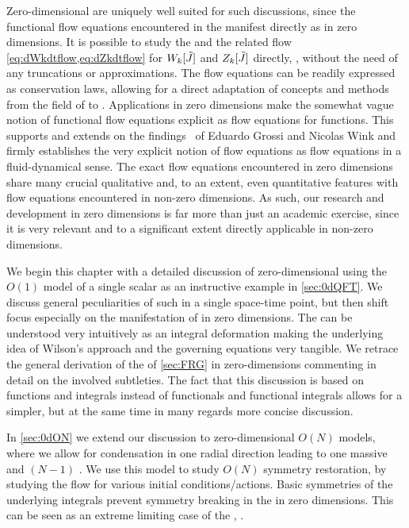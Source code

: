 Zero-dimensional \qfts{} are uniquely well suited for such discussions, since the functional flow equations encountered in the \frg{} manifest directly as \pdes{} in zero dimensions.
It is possible to study the \frgEq{} and the related flow \cref{eq:dWkdtflow,eq:dZkdtflow} for $W_k[\tilde{J}]$ and $Z_k[\tilde{J}]$ directly, \ie{}, without the need of any truncations or approximations.
The flow equations can be readily expressed as conservation laws, allowing for a direct adaptation of concepts and methods from the field of \cfd{} to \frg{}.
Applications in zero dimensions make the somewhat vague notion of functional flow equations explicit as flow equations for functions. 
This supports and extends on the findings~\cite{Grossi:2021ksl} of Eduardo Grossi and Nicolas Wink and firmly establishes the very explicit notion of \frg{} flow equations as flow equations in a fluid-dynamical sense.
The exact flow equations encountered in zero dimensions share many crucial qualitative and, to an extent, even quantitative features with flow equations encountered in non-zero dimensions.
As such, our research and development in zero dimensions is far more than just an academic exercise, since it is very relevant and to a significant extent directly applicable in non-zero dimensions.\bigskip

We begin this chapter with a detailed discussion of zero-dimensional \qft{} using the $O(1)$ model of a single scalar as an instructive example in \cref{sec:0dQFT}.
We discuss general peculiarities of such \qfts{} in a single space-time point, but then shift focus especially on the manifestation of \frg{} in zero dimensions.
The \frg{} can be understood very intuitively  as an integral deformation \dash{} making the underlying idea of Wilson's \rg{} approach and the governing equations very tangible.
We retrace the general derivation of the \frgEq{} of \cref{sec:FRG} in zero-dimensions commenting in detail on the involved subtleties.
The fact that this discussion is based on functions and integrals instead of functionals and functional integrals allows for a simpler, but at the same time in many regards more concise discussion.\bigskip

In \cref{sec:0dON} we extend our discussion to zero-dimensional $O(N)$ models, where we allow for condensation in one radial direction leading to one massive \sigmaMode{} and $(N-1)$ \pionModes{}.
We use this model to study $O(N)$ symmetry restoration, by studying the \frg{} flow for various initial conditions/actions.
Basic symmetries of the underlying integrals prevent symmetry breaking in the \ir{} in zero dimensions.
This can be seen as an extreme limiting case of the \cmwhTheoremWithRefs{}, \cf{} \MWApp{}.

